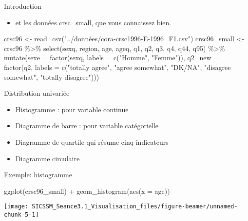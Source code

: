 \documentclass[
  ignorenonframetext,
]{beamer}
\newenvironment{Shaded}{\begin{snugshade}}{\end{snugshade}}
\newcommand{\AttributeTok}[1]{\textcolor[rgb]{0.77,0.63,0.00}{#1}}
\newcommand{\FunctionTok}[1]{\textcolor[rgb]{0.00,0.00,0.00}{#1}}
\newcommand{\NormalTok}[1]{#1}
\newcommand{\OtherTok}[1]{\textcolor[rgb]{0.56,0.35,0.01}{#1}}
\newcommand{\SpecialCharTok}[1]{\textcolor[rgb]{0.00,0.00,0.00}{#1}}
\newcommand{\StringTok}[1]{\textcolor[rgb]{0.31,0.60,0.02}{#1}}
\providecommand{\tightlist}{%
  \setlength{\itemsep}{0pt}\setlength{\parskip}{0pt}}
\begin{document}
\begin{frame}[fragile]{Introduction}
\protect\hypertarget{introduction-5}{}
\begin{itemize}
\tightlist
\item
  et les données crsc\_small, que vous connaissez bien.
\end{itemize}

\begin{Shaded}
\begin{Highlighting}[]
\NormalTok{crsc96 }\OtherTok{\textless{}{-}} \FunctionTok{read\_csv}\NormalTok{(}\StringTok{"../données/cora{-}crsc1996{-}E{-}1996\_F1.csv"}\NormalTok{)}
\NormalTok{crsc96\_small }\OtherTok{\textless{}{-}}
\NormalTok{  crsc96 }\SpecialCharTok{\%\textgreater{}\%} 
  \FunctionTok{select}\NormalTok{(sexq, region, age, ageq, q1, q2, q3, q4, q44, q95) }\SpecialCharTok{\%\textgreater{}\%} 
  \FunctionTok{mutate}\NormalTok{(}\AttributeTok{sexe =} \FunctionTok{factor}\NormalTok{(sexq, }\AttributeTok{labels =} \FunctionTok{c}\NormalTok{(}\StringTok{"Homme"}\NormalTok{, }\StringTok{"Femme"}\NormalTok{)),}
         \AttributeTok{q2\_new =} \FunctionTok{factor}\NormalTok{(q2, }
                         \AttributeTok{labels =} \FunctionTok{c}\NormalTok{(}\StringTok{"totally agree"}\NormalTok{, }\StringTok{"agree somewhat"}\NormalTok{, }
                                    \StringTok{"DK/NA"}\NormalTok{, }\StringTok{"disagree somewhat"}\NormalTok{, }\StringTok{"totally disagree"}\NormalTok{)))}
\end{Highlighting}
\end{Shaded}
\end{frame}

\begin{frame}{Distribution univariée}
\protect\hypertarget{distribution-univariuxe9e}{}
\begin{itemize}
\tightlist
\item
  Histogramme : pour variable continue
\item
  Diagramme de barre : pour variable catégorielle
\item
  Diagramme de quartile qui résume cinq indicateurs
\item
  Diagramme circulaire
\end{itemize}
\end{frame}

\begin{frame}[fragile]{Exemple: histogramme}
\protect\hypertarget{exemple-histogramme}{}
\begin{Shaded}
\begin{Highlighting}[]
\FunctionTok{ggplot}\NormalTok{(crsc96\_small) }\SpecialCharTok{+}
  \FunctionTok{geom\_histogram}\NormalTok{(}\FunctionTok{aes}\NormalTok{(}\AttributeTok{x =}\NormalTok{ age))}
\end{Highlighting}
\end{Shaded}

\begin{center}\texttt{[image: SICSSM\_Seance3.1\_Visualisation\_files/figure-beamer/unnamed-chunk-5-1]} \end{center}
\end{frame}
\end{document}
